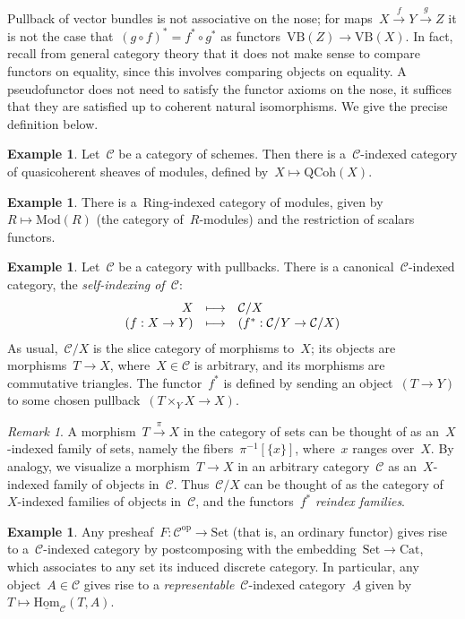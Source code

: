 \documentclass[a4paper,english,12pt]{scrartcl}
\theoremstyle{definition}
\newtheorem{ex}[defn]{Example}
\theoremstyle{plain}
\theoremstyle{remark}
\newtheorem{rem}[defn]{Remark}
\newcommand{\C}{\mathcal{C}}
\newcommand{\op}{\mathrm{op}}
\newcommand{\xra}[1]{\xrightarrow{#1}}
\renewcommand{\_}{\mathpunct{.}\,}
\newcommand{\?}{\,{:}\,}
\newcommand{\Mod}{\mathrm{Mod}}
\newcommand{\Set}{\mathrm{Set}}
\newcommand{\Cat}{\mathrm{Cat}}
\newcommand{\VB}{\mathrm{VB}}
\newcommand{\QCoh}{\mathrm{QCoh}}
\newcommand{\Hom}{\underline{\mathrm{Hom}}}
\newcommand{\ul}[1]{\underline{#1}}
\begin{document}
Pullback of vector bundles is not associative on the nose; for maps~$X \xra{f}
Y \xra{g} Z$ it is not the case that~$(g \circ f)^* = f^* \circ g^*$ as
functors~$\VB(Z) \to \VB(X)$. In fact, recall from general category theory that
it does not make sense to compare functors on equality, since this involves
comparing objects on equality. A pseudofunctor does not need to satisfy the
functor axioms on the nose, it suffices that they are satisfied up to coherent
natural isomorphisms. We give the precise definition below.

\begin{ex}Let~$\C$ be a category of schemes. Then there is a~$\C$-indexed
category of quasicoherent sheaves of modules, defined by~$X \mapsto \QCoh(X)$.
\end{ex}

\begin{ex}There is a~$\mathrm{Ring}$-indexed category of modules, given by~$R
\mapsto \Mod(R)$ (the category of~$R$-modules) and the restriction of scalars
functors.
\end{ex}

\begin{ex}Let~$\C$ be a category with pullbacks. There is a
canonical~$\C$-indexed category, the \emph{self-indexing of~$\C$}:
\[ \begin{array}{@{}rcl@{}}
  X &\longmapsto& \C/X \\
  (f : X \to Y) &\longmapsto&
    (f^* : \C/Y \to \C/X)
\end{array} \]
As usual,~$\C/X$ is the slice category of morphisms to~$X$; its objects are
morphisms~$T \to X$, where~$X \in \C$ is arbitrary, and its morphisms are
commutative triangles. The functor~$f^*$ is defined by sending an object~$(T
\to Y)$ to some chosen pullback~$(T \times_Y X \to X)$.\end{ex}

\begin{rem}A morphism~$T \xra{\pi} X$ in the category of sets can be thought of as
an~$X$-indexed family of sets, namely the fibers~$\pi^{-1}[\{x\}]$, where~$x$
ranges over~$X$. By analogy, we visualize a morphism~$T \to X$ in an arbitrary
category~$\C$ as an~$X$-indexed family of objects in~$\C$. Thus~$\C/X$ can be
thought of as the category of~$X$-indexed families of objects in~$\C$, and the
functors~$f^*$ \emph{reindex families}.
\end{rem}

\begin{ex}Any presheaf~$F : \C^\op \to \Set$ (that is, an ordinary functor)
gives rise to a~$\C$-indexed category by postcomposing with the embedding~$\Set
\to \Cat$, which associates to any set its induced discrete category. In
particular, any object~$A \in \C$ gives rise to a \emph{representable}~$\C$-indexed
category~$\ul{A}$ given by~$T \mapsto \Hom_\C(T,A)$.
\end{ex}
\end{document}
